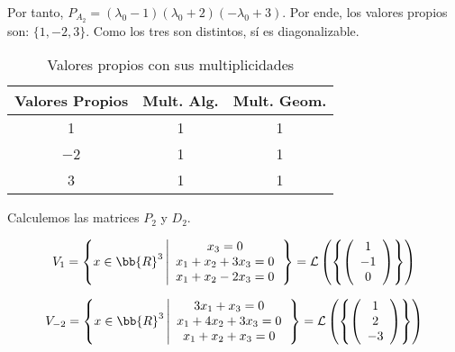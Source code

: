 \begin{ejercicio}
\begin{enumerate}
\begin{enumerate}
            \begin{figure}[H]
                \centering
                 \hspace{1cm} 
            \end{figure}

            Por tanto, $P_{A_2} = (\lambda_0-1)(\lambda_0+2)(-\lambda_0+3)$. Por ende, 
            los valores propios son: $\{1, -2, 3\}$. Como los tres son distintos, sí es diagonalizable.
            \begin{table}[H]
                \centering
                \begin{tabular}{c|c|c}
                    Valores Propios & Mult. Alg. & Mult. Geom. \\ \hline 
                    1 & 1 & 1\\
                    $-$2 & 1 & 1\\
                    3 & 1 & 1\\
                \end{tabular}
                \caption{Valores propios con sus multiplicidades}
            \end{table}
            
            Calculemos las matrices $P_2$ y $D_2$.
    
            \begin{equation*}
            V_1 = \left\{x\in\bb{R}^3 \left| \begin{array}{c}
                 x_3=0  \\
                 x_1+x_2+3x_3 = 0 \\
                 x_1+x_2-2x_3 = 0
            \end{array}\right.\right\} = \mathcal{L}\left(\left\{ \left(\begin{array}{c}
                    1 \\
                    -1 \\
                    0 \\
               \end{array}\right)
               \right\}\right)
            \end{equation*}
    
            \begin{equation*}
            V_{-2} = \left\{x\in\bb{R}^3 \left| \begin{array}{c}
                 3x_1+x_3=0  \\
                 x_1+4x_2+3x_3=0 \\
                 x_1+x_2+x_3 = 0
            \end{array}\right.\right\} = \mathcal{L}\left(\left\{ \left(\begin{array}{c}
                    1 \\
                    2 \\
                    -3 \\
               \end{array}\right)
               \right\}\right)
            \end{equation*}
    

\end{enumerate}
\end{enumerate}
\end{ejercicio}
